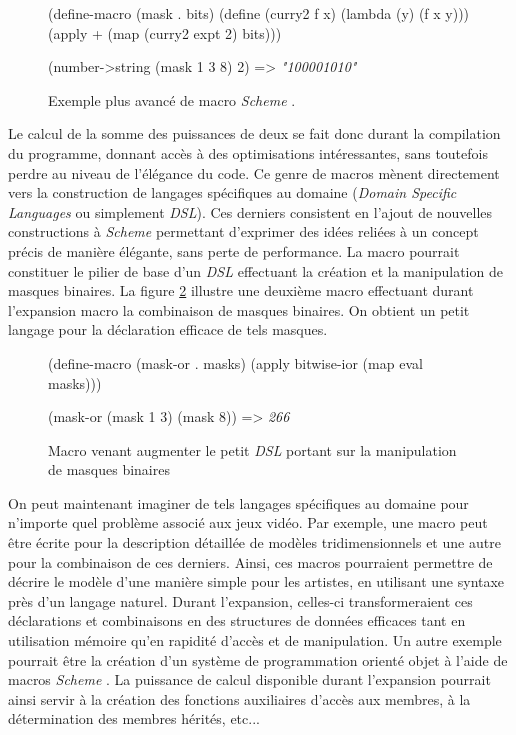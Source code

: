 \documentclass[12pt,twoside,letterpaper,francais]{book}
\newcommand{\Schemelang}{{\textit{Scheme }}}
\newcommand{\scheme}[1]{\selectlanguage{english}{\tt #1}\selectlanguage{french}}
\newcommand{\schemeresult}[1]{{\it #1}}
\begin{document}
\begin{figure}[htb!]
  \begin{schemecode}
(define-macro (mask . bits)
  (define (curry2 f x) (lambda (y) (f x y)))
  (apply + (map (curry2 expt 2) bits)))

(number->string (mask 1 3 8) 2) => \schemeresult{"100001010"}
  \end{schemecode}
  \caption{Exemple plus avancé de macro \Schemelang.}
  \label{Scheme:macro-ex1}
\end{figure}

Le calcul de la somme des puissances de deux se fait donc durant la
compilation du programme, donnant accès à des optimisations
intéressantes, sans toutefois perdre au niveau de l'élégance du
code. Ce genre de macros mènent directement vers la construction de
langages spécifiques au domaine (\textit{Domain Specific Languages} ou
simplement \textit{DSL}). Ces derniers consistent en l'ajout de
nouvelles constructions à \Schemelang permettant d'exprimer des idées
reliées à un concept précis de manière élégante, sans perte de
performance. La macro \scheme{mask} pourrait constituer le pilier de
base d'un \textit{DSL} effectuant la création et la manipulation de
masques binaires. La figure \ref{Scheme:macro-mini-dsl} illustre une
deuxième macro effectuant durant l'expansion macro la combinaison de
masques binaires. On obtient un petit langage pour la déclaration
efficace de tels masques.\\

\begin{figure}[htb!]
  \begin{schemecode}
(define-macro (mask-or . masks)
  (apply bitwise-ior (map eval masks)))

(mask-or (mask 1 3) (mask 8)) => \schemeresult{266}
  \end{schemecode}
  \caption{Macro venant augmenter le petit \textit{DSL} portant sur la
    manipulation de masques binaires}
  \label{Scheme:macro-mini-dsl}
\end{figure}

On peut maintenant imaginer de tels langages spécifiques au domaine
pour n'importe quel problème associé aux jeux vidéo. Par exemple, une
macro peut être écrite pour la description détaillée de modèles
tridimensionnels et une autre pour la combinaison de ces
derniers. Ainsi, ces macros pourraient permettre de décrire le modèle
d'une manière simple pour les artistes, en utilisant une syntaxe près
d'un langage naturel. Durant l'expansion, celles-ci transformeraient
ces déclarations et combinaisons en des structures de données
efficaces tant en utilisation mémoire qu'en rapidité d'accès et de
manipulation. Un autre exemple pourrait être la création d'un système
de programmation orienté objet à l'aide de macros \Schemelang. La
puissance de calcul disponible durant l'expansion pourrait ainsi
servir à la création des fonctions auxiliaires d'accès aux membres, à
la détermination des membres hérités, etc...
\end{document}
